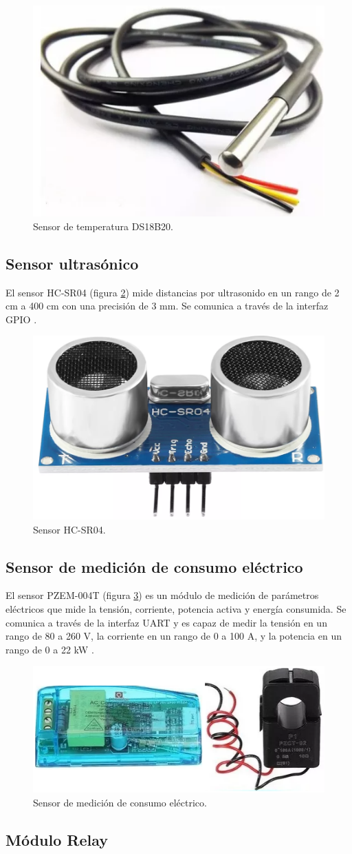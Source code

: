 \begin{figure}[H]
	\centering
	\includegraphics[width=.15\textwidth]{./Images/10.png}
	\caption{Sensor de temperatura DS18B20.}
	\label{fig:DS18B20}
\end{figure}

\subsection{Sensor ultrasónico}

El sensor HC-SR04 (figura \ref{fig:HC-SR04}) mide distancias por ultrasonido en
un rango de 2 cm a 400 cm con una precisión de 3 mm. Se comunica a través de la
interfaz GPIO \cite{HC-SR04}.

\begin{figure}[H]
	\centering
	\includegraphics[width=.15\textwidth]{./Images/11.png}
	\caption{Sensor HC-SR04.}
	\label{fig:HC-SR04}
\end{figure}

\subsection{Sensor de medición de consumo eléctrico}

El sensor PZEM-004T (figura \ref{fig:PZEM-004T}) es un módulo de medición de
parámetros eléctricos que mide la tensión, corriente, potencia activa y energía
consumida. Se comunica a través de la interfaz UART y es capaz de medir la
tensión en un rango de 80 a 260 V, la corriente en un rango de 0 a 100 A, y la
potencia en un rango de 0 a 22 kW \cite{PZEM-004T}.

\begin{figure}[H]
	\centering
	\includegraphics[width=.25\textwidth]{./Images/12.png}
	\caption{Sensor de medición de consumo eléctrico.}
	\label{fig:PZEM-004T}
\end{figure}

\subsection{Módulo Relay}

